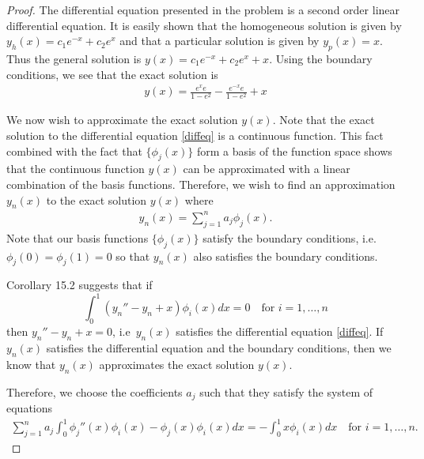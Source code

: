 \begin{proof}
  The differential equation presented in the problem is a second order linear
  differential equation. It is easily shown that the homogeneous solution is
  given by $y_h(x) = c_1 e^{-x} + c_2e^{x}$ and that a particular solution is
  given by $y_p(x) = x$. Thus the general solution is $y(x) = c_1 e^{-x} + c_2e^{x} + x$.
  Using the boundary conditions, we see that the exact solution is
  \begin{align}\label{exact}
    y(x) = \frac{e^{x}e}{1-e^2} -\frac{e^{-x}e}{1-e^2} + x
  \end{align}

  We now wish to approximate the exact solution $y(x)$.
  Note that the exact solution to the differential equation \eqref{diffeq} is
  a continuous function. This fact combined with the fact that $\{\phi_j(x)\}$
  form a basis of the function space shows that the continuous function $y(x)$
  can be approximated with a linear combination of the basis functions.
  Therefore, we wish to find an approximation $y_n(x)$ to the exact solution
  $y(x)$ where
  \begin{align}\label{finite_approximation}
    y_n(x) = \sum_{j=1}^n a_j \phi_j(x).
  \end{align}
  Note that our basis functions $\{\phi_j(x)\}$ satisfy the boundary
  conditions, i.e.\ $\phi_j(0) = \phi_j(1) = 0$ so that $y_n(x)$ also satisfies the
  boundary conditions.

  Corollary 15.2 suggests that if
  \[
    \int_0^1 (y_n'' - y_n + x)\phi_i(x) dx = 0 \quad \text{for $i=1,\dots,n$}
  \]
  then $y_n'' - y_n + x = 0$, i.e\ $y_n(x)$ satisfies the differential
  equation \eqref{diffeq}. If $y_n(x)$ satisfies the
  differential equation and the boundary conditions, then we know that $y_n(x)$
  approximates the exact solution $y(x)$.

  Therefore, we choose the coefficients $a_j$ such that they satisfy the system of
  equations
  \begin{align}\label{first_system}
    \sum_{j=1}^n a_j \int_0^1 \phi_j''(x)\phi_i(x) - \phi_j(x)\phi_i(x) dx = -\int_0^1 x \phi_i(x) dx \quad \text{for $i=1,\dots,n$}.
  \end{align}


\end{proof}
